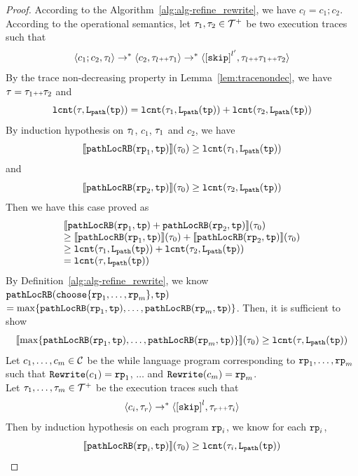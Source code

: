 \begin{proof}
According to the Algorithm~\ref{alg:alg-refine_rewrite}, we have $c_l = c_1; c_2$.
\\
According to the operational semantics, let $\mathtt{\tau}_1, \mathtt{\tau}_2 \in \mathcal{T}^{+}$ be two execution traces such that 
\[
  \config{c_1; c_2, \trace_l} \to^* \config{c_2, \trace_l \tracecat \trace_1} \to^* \config{\clabel{\eskip}^{l'}, \trace_l \tracecat \trace_1 \tracecat \trace_2}
\]
By the trace non-decreasing property in Lemma~\ref{lem:tracenondec}, we have $\mathtt{\tau} = \mathtt{\tau}_1 {\scriptscriptstyle ++} \mathtt{\tau}_2$ and 
\[
  \mathtt{lcnt}(\mathtt{\tau}, \mathtt{L}_{\mathtt{path}}(\mathtt{tp}))  = \mathtt{lcnt}(\mathtt{\tau}_1,  \mathtt{L}_{\mathtt{path}}(\mathtt{tp}))  + \mathtt{lcnt}(\mathtt{\tau}_2,  \mathtt{L}_{\mathtt{path}}(\mathtt{tp})) 
\]
By induction hypothesis on $\mathtt{\tau}_l$, $c_1$, $\mathtt{\tau}_1$ and $c_2$, we have
\[
  \llbracket \mathtt{pathLocRB}(\mathtt{rp}_1, \mathtt{tp}) \rrbracket(\mathtt{\tau}_0) \geq \mathtt{lcnt}(\mathtt{\tau}_1,  \mathtt{L}_{\mathtt{path}}(\mathtt{tp})) 
\]
 and 
  \[
    \llbracket \mathtt{pathLocRB}(\mathtt{rp}_2, \mathtt{tp}) \rrbracket(\mathtt{\tau}_0) \geq \mathtt{lcnt}(\mathtt{\tau}_2,  \mathtt{L}_{\mathtt{path}}(\mathtt{tp})) 
  \]
Then we have this case proved as
\[
  \begin{array}{l}
  \llbracket \mathtt{pathLocRB}(\mathtt{rp}_1, \mathtt{tp}) + \mathtt{pathLocRB}(\mathtt{rp}_2, \mathtt{tp}) \rrbracket(\mathtt{\tau}_0)
  \\
  \geq \llbracket \mathtt{pathLocRB}(\mathtt{rp}_1, \mathtt{tp}) \rrbracket(\mathtt{\tau}_0) + \llbracket \mathtt{pathLocRB}(\mathtt{rp}_2, \mathtt{tp}) \rrbracket(\mathtt{\tau}_0)
  \\
  \geq \mathtt{lcnt}(\mathtt{\tau}_1,  \mathtt{L}_{\mathtt{path}}(\mathtt{tp}))  + \mathtt{lcnt}(\mathtt{\tau}_2,  \mathtt{L}_{\mathtt{path}}(\mathtt{tp})) 
  \\
  = \mathtt{lcnt}(\mathtt{\tau}, \mathtt{L}_{\mathtt{path}}(\mathtt{tp}))
  \end{array}
  \] 
By Definition~\ref{alg:alg-refine_rewrite}, we know 
$\outinB(\rpchoose{\rprog_1, \ldots, \rprog_m }, \tpath)$ 
\\
$= \max\left\{ \outinB(\rprog_1, \tpath), \ldots, \outinB(\rprog_m, \tpath) \right\}$.
Then, it is sufficient to show
\[
  \econfig{\max\left\{ \outinB(\rprog_1, \tpath), \ldots, \outinB(\rprog_m, \tpath) \right\}}(\trace_0) \geq \lcounter(\trace, \pathl(\tpath)) 
\]
Let $c_1, \ldots, c_m \in \mathcal{C}$ be the while language program corresponding to $\mathtt{rp}_1, \ldots, \mathtt{rp}_m$ such that $\mathtt{Rewrite}(c_1) = \mathtt{rp}_1$, $\ldots$ and  $\mathtt{Rewrite}(c_m) = \mathtt{rp}_m$.
\\
Let $\mathtt{\tau}_1, \ldots, \mathtt{\tau}_m \in \mathcal{T}^{+}$ be the execution traces such that 
\[
  \config{c_i, \trace_r} \to^* 
  \config{\clabel{\eskip}^{l}, \trace_r \tracecat \trace_i}
\]
Then by induction hypothesis on each program $\mathtt{rp}_i$, we know for each $\mathtt{rp}_i$,
\[
  \llbracket \mathtt{pathLocRB}(\mathtt{rp}_i, \mathtt{tp}) \rrbracket(\mathtt{\tau}_0)  \geq \mathtt{lcnt}(\mathtt{\tau}_i, \mathtt{L}_{\mathtt{path}}(\mathtt{tp})) 
\]

\end{proof}
